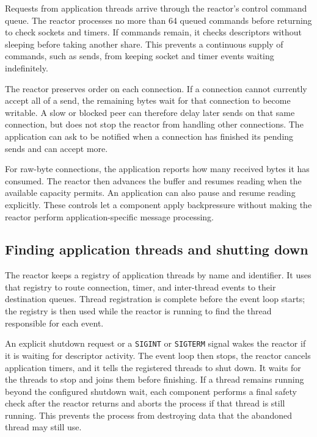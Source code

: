 Requests from application threads arrive through the reactor's control
command queue. The reactor processes no more than 64 queued commands before
returning to check sockets and timers. If commands remain, it checks
descriptors without sleeping before taking another share. This prevents a
continuous supply of commands, such as sends, from keeping socket and timer
events waiting indefinitely.

The reactor preserves order on each connection. If a connection cannot
currently accept all of a send, the remaining bytes wait for that connection
to become writable. A slow or blocked peer can therefore delay later sends
on that same connection, but does not stop the reactor from handling other
connections. The application can ask to be notified when a connection has
finished its pending sends and can accept more.

For raw-byte connections, the application reports how many received bytes it
has consumed. The reactor then advances the buffer and resumes reading when
the available capacity permits. An application can also pause and resume
reading explicitly. These controls let a component apply backpressure
without making the reactor perform application-specific message processing.

\subsection{Finding application threads and shutting down}
\label{sec:fw_reactor_routing_shutdown}

The reactor keeps a registry of application threads by name and identifier.
It uses that registry to route connection, timer, and inter-thread events to
their destination queues. Thread registration is complete before the event
loop starts; the registry is then used while the reactor is running to find
the thread responsible for each event.

An explicit shutdown request or a \texttt{SIGINT} or \texttt{SIGTERM} signal
wakes the reactor if it is waiting for descriptor activity. The event loop
then stops, the reactor cancels application timers, and it tells the
registered threads to shut down. It waits for the threads to stop and joins
them before finishing. If a thread remains running beyond the configured
shutdown wait, each component performs a final safety check after the reactor
returns and aborts the process if that thread is still running. This prevents
the process from destroying data that the abandoned thread may still use.

